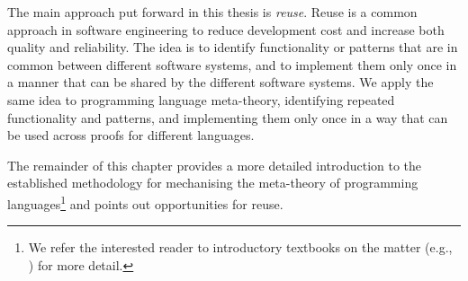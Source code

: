 {The main approach put forward in this thesis is \emph{reuse}. Reuse is a common
approach in software engineering to reduce development cost and increase both
quality and reliability. The idea is to identify functionality or patterns that
are in common between different software systems, and to implement them only once
in a manner that can be shared by the different software systems. We apply the
same idea to programming language meta-theory, identifying repeated
functionality and patterns, and implementing them only once in a way that can
be used across proofs for different languages.

% 

The remainder of this chapter provides a more detailed introduction to the
established methodology for mechanising the meta-theory of programming
languages\footnote{We refer the interested
reader to introductory textbooks on the matter (e.g., \cite{tapl}) for more
detail.} and points out opportunities for reuse. 



}
